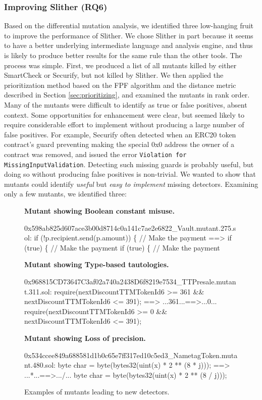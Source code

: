 \subsubsection{Improving Slither {\bf (RQ6)}}

Based on the differential mutation analysis, we identified three low-hanging fruit to improve the performance of Slither.  We chose Slither in part because it seems to have a better underlying intermediate language and analysis engine, and thus is likely to produce better results for the same rule than the other tools.  The process was simple.  First, we produced a list of all mutants killed by either SmartCheck or Securify, but not killed by Slither.  We then applied the prioritization method based on the FPF algorithm and the distance metric described in Section \ref{sec:prioritizing}, and examined the mutants in rank order.  Many of the mutants were difficult to identify as true or false positives, absent context.  Some opportunities for enhancement were clear, but seemed likely to require considerable effort to implement without producing a large number of false positives.  For example, Securify often detected when an ERC20 token contract's guard preventing making the special 0x0 address the owner of a contract was removed, and issued the error {\tt Violation for MissingInputValidation}. Detecting such missing guards is probably useful, but doing so without producing false positives is non-trivial.  We wanted to show that mutants could identify \emph{useful} but \emph{easy to implement} missing detectors.  Examining only a few mutants, we identified three:

\begin{figure}
  {\scriptsize
      {\bf Mutant showing Boolean constant misuse.}

    
\noindent \begin{code}
 0x598ab825d607ace3b00d8714c0a141c7ae2e6822\_Vault.mutant.275.sol:
 if (!p.recipient.send(p.amount)) \{  // Make the payment
 ==>          if (true) \{  // Make the payment
 if (true) \{  // Make the payment
      \end{code}

      }

      {\scriptsize
              {\bf Mutant showing Type-based tautologies.}
\begin{code}
 0x968815CD73647C3af02a740a2438D6f8219e7534\_TTPresale.mutant.311.sol:
 require(nextDiscountTTMTokenId6 >= 361 \&\& nextDiscountTTMTokenId6 <= 391);
 ==>  ...361...==>...0...
 require(nextDiscountTTMTokenId6 >= 0 \&\& nextDiscountTTMTokenId6 <= 391);
      \end{code}
      }


      {\scriptsize
      {\bf Mutant showing Loss of precision.}        
\begin{code}
 0x534ccee849a688581d1b0c65e7ff317ed10c5ed3\_NametagToken.mutant.480.sol:
 byte char = byte(bytes32(uint(x) * 2 ** (8 * j)));
 ==>  ...*...==>.../...
 byte char = byte(bytes32(uint(x) * 2 ** (8 / j)));
      \end{code}

}
        \caption{Examples of mutants leading to new detectors.}
       \label{fig:newdetect}
    \end{figure}


